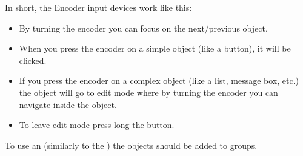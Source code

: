 \documentclass[letterpaper,10pt,english]{sphinxmanual}
\begin{document}
In short, the Encoder input devices work like this:
\begin{itemize}
\item {} 
By turning the encoder you can focus on the next/previous object.

\item {} 
When you press the encoder on a simple object (like a button), it will be clicked.

\item {} 
If you press the encoder on a complex object (like a list, message box, etc.) the object will go to edit mode where by turning the encoder you can navigate inside the object.

\item {} 
To leave edit mode press long the button.

\end{itemize}

To use an  (similarly to the ) the objects should be added to groups.

\begin{sphinxVerbatim}[commandchars=\\\{\}]
  
  

 
    
    
  
     
     
  
    
\end{sphinxVerbatim}
\end{document}
